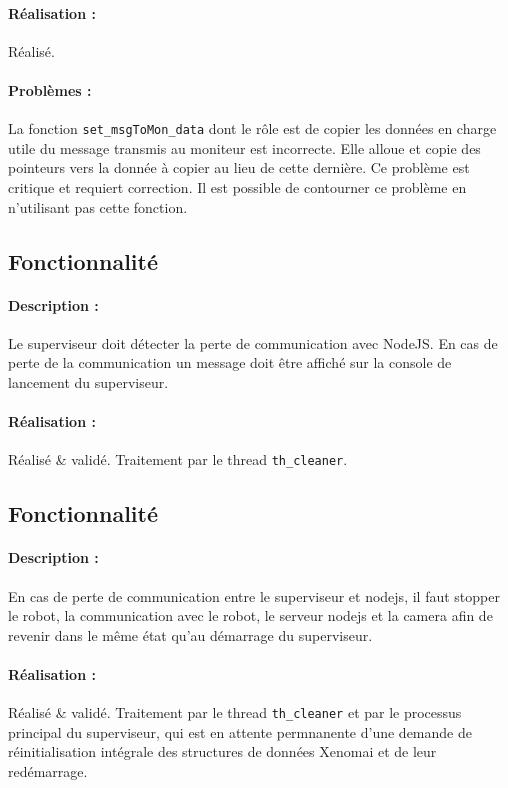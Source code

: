 \documentclass[11pt, a4paper]{paper}
\newcounter{cptreq}
\begin{document}
\paragraph{\color{black}Réalisation :} {\color{black} Réalisé.}

\paragraph{\color{black}Problèmes :} {\color{black} La fonction {\tt set\_msgToMon\_data} dont le rôle est de copier les données en charge utile du message transmis au moniteur est incorrecte. Elle alloue et copie des pointeurs vers la donnée à copier au lieu de cette dernière. Ce problème est critique et requiert correction. Il est possible de contourner ce problème en n'utilisant pas cette fonction.}

\subsection{Fonctionnalité \thecptreq}

\paragraph{Description :} Le superviseur doit détecter la perte de communication avec NodeJS. En cas de perte de la communication un message doit être affiché sur la console de lancement du superviseur.

\paragraph{\color{black}Réalisation :} {\color{black} Réalisé \& validé. Traitement par le thread {\tt th\_cleaner}.}
\subsection{Fonctionnalité \thecptreq}

\paragraph{Description :} En cas de perte de communication entre le superviseur et nodejs, il faut stopper le robot,  la communication avec le robot, le serveur nodejs et la camera afin de revenir dans le même état qu'au démarrage du superviseur.

\paragraph{\color{black}Réalisation :}  {\color{black} Réalisé \& validé. Traitement par le thread {\tt th\_cleaner} et par le processus principal du superviseur, qui est en attente permnanente d'une demande de réinitialisation intégrale des structures de données Xenomai et de leur redémarrage.}
\end{document}
